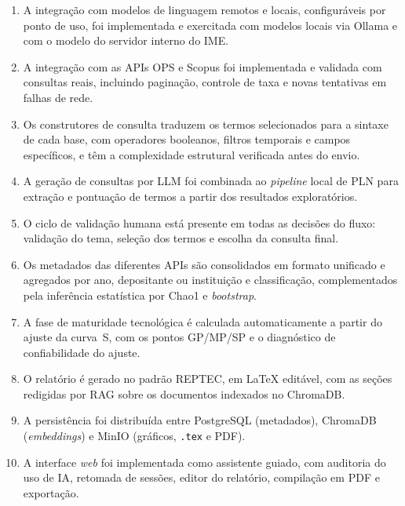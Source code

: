 \documentclass[12pt, a4paper]{article}
\begin{document}
  \begin{enumerate}[label=\roman*.]
    \item A integração com modelos de linguagem remotos e locais, configuráveis
    por ponto de uso, foi implementada e exercitada com modelos locais via
    Ollama e com o modelo do servidor interno do IME.

    \item A integração com as APIs OPS e Scopus foi implementada e validada
    com consultas reais, incluindo paginação, controle de taxa e novas
    tentativas em falhas de rede.

    \item Os construtores de consulta traduzem os termos selecionados para a
    sintaxe de cada base, com operadores booleanos, filtros temporais e campos
    específicos, e têm a complexidade estrutural verificada antes do envio.

    \item A geração de consultas por LLM foi combinada ao \textit{pipeline}
    local de PLN para extração e pontuação de termos a partir dos resultados
    exploratórios.

    \item O ciclo de validação humana está presente em todas as decisões do
    fluxo: validação do tema, seleção dos termos e escolha da consulta final.

    \item Os metadados das diferentes APIs são consolidados em formato
    unificado e agregados por ano, depositante ou instituição e classificação,
    complementados pela inferência estatística por Chao1 e \textit{bootstrap}.

    \item A fase de maturidade tecnológica é calculada automaticamente a partir
    do ajuste da curva~S, com os pontos GP/MP/SP e o diagnóstico de
    confiabilidade do ajuste.

    \item O relatório é gerado no padrão REPTEC, em LaTeX editável, com as
    seções redigidas por RAG sobre os documentos indexados no ChromaDB.

    \item A persistência foi distribuída entre PostgreSQL (metadados), ChromaDB
    (\textit{embeddings}) e MinIO (gráficos, \texttt{.tex} e PDF).

    \item A interface \textit{web} foi implementada como assistente guiado, com
    auditoria do uso de IA, retomada de sessões, editor do relatório,
    compilação em PDF e exportação.
  \end{enumerate}
\end{document}
